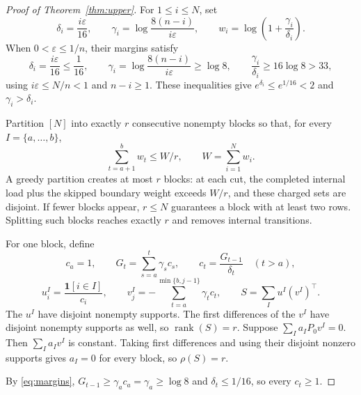 \documentclass[10pt]{article}
\theoremstyle{definition}
\DeclareMathOperator{\rank}{rank}
\begin{document}
\begin{proof}[Proof of Theorem~\ref{thm:upper}]
For \(1\le i\le N\), set
\[
 \delta_i=\frac{i\varepsilon}{16},\qquad
 \gamma_i=\log\frac{8(n-i)}{i\varepsilon},\qquad
 w_i=\log\left(1+\frac{\gamma_i}{\delta_i}\right).
\]
When \(0<\varepsilon\le1/n\), their margins satisfy
\begin{equation}\label{eq:margins}
 \delta_i=\frac{i\varepsilon}{16}\le\frac1{16},
 \qquad
 \gamma_i=\log\frac{8(n-i)}{i\varepsilon}\ge\log 8,
 \qquad
 \frac{\gamma_i}{\delta_i}\ge16\log 8>33,
\end{equation}
using \(i\varepsilon\le N/n<1\) and \(n-i\ge1\).  These inequalities give
\(e^{\delta_i}\le e^{1/16}<2\) and \(\gamma_i>\delta_i\).

Partition \([N]\) into exactly \(r\) consecutive
nonempty blocks so that, for every \(I=\{a,\ldots,b\}\),
\[
 \sum_{t=a+1}^{b}w_t\le W/r,\qquad W=\sum_{i=1}^Nw_i.
\]
A greedy partition creates at most \(r\) blocks: at each cut, the completed
internal load plus the skipped boundary weight exceeds \(W/r\), and these
charged sets are disjoint.  If fewer blocks appear, \(r\le N\) guarantees a
block with at least two rows.  Splitting such blocks reaches exactly \(r\)
and removes internal transitions.

For one block, define
\[
 c_a=1,\qquad G_t=\sum_{s=a}^{t}\gamma_sc_s,\qquad
 c_t=\frac{G_{t-1}}{\delta_t}\quad(t>a),
\]
\[
 u_i^I=\frac{\mathbf1[i\in I]}{c_i},\qquad
 v_j^I=-\sum_{t=a}^{\min\{b,j-1\}}\gamma_tc_t,
\qquad
 S=\sum_Iu^I(v^I)^\top .
\]
The \(u^I\) have disjoint nonempty supports.  The first differences of the
\(v^I\) have disjoint nonempty supports as well, so \(\rank(S)=r\).  Suppose
\(\sum_I a_IP_0v^I=0\).  Then \(\sum_Ia_Iv^I\) is constant.  Taking first
differences and using their disjoint nonzero supports gives \(a_I=0\) for
every block, so \(\rho(S)=r\).

By \eqref{eq:margins}, \(G_{t-1}\ge\gamma_ac_a=\gamma_a\ge\log8\) and
\(\delta_t\le1/16\), so every \(c_t\ge1\).


\end{proof}
\end{document}
